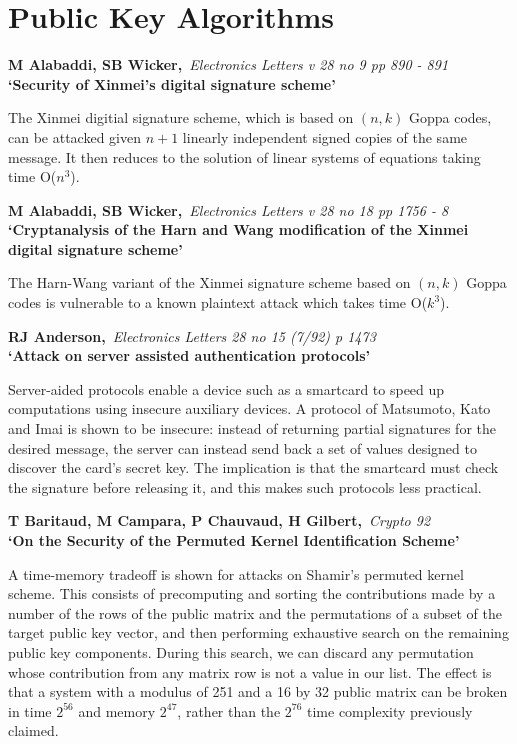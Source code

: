 \pagebreak

\normalsize
\section{Public Key Algorithms}
\small

{\bf \noindent M Alabaddi, SB Wicker,}{\em ~Electronics Letters v 28 no 9 
pp 890 - 891\\}
{\bf `Security of Xinmei's digital signature scheme'}

The Xinmei digitial signature scheme, which is based on $(n,k)$ Goppa codes,
can be attacked given $n+1$ linearly independent signed copies of the same
message. It then reduces to the solution of linear systems of equations taking
time O($n^3$).

{\bf \noindent M Alabaddi, SB Wicker,}{\em ~Electronics Letters v 28 no 18 
pp 1756 - 8\\}
{\bf `Cryptanalysis of the Harn and Wang modification of the Xinmei digital
signature scheme'}

The Harn-Wang variant of the Xinmei signature scheme based on $(n,k)$ Goppa
codes is vulnerable to a known plaintext attack which takes time O($k^3$).

{\bf \noindent RJ Anderson,}{\em ~Electronics Letters 28 no 15 (7/92) p 1473\\}
{\bf `Attack on server assisted authentication protocols'}

Server-aided protocols enable a device such as a smartcard to speed up
computations using insecure auxiliary devices. A protocol of Matsumoto,
Kato and Imai is shown to be insecure: instead of returning partial
signatures for the desired message, the server can instead send back a
set of values designed to discover the card's secret key. The implication
is that the smartcard must check the signature before releasing it, and 
this makes such protocols less practical.

{\bf \noindent T Baritaud, M Campara, P Chauvaud, H Gilbert,}{\em ~Crypto 92\\}
{\bf `On the Security of the Permuted Kernel Identification Scheme'}

A time-memory tradeoff is shown for attacks on Shamir's permuted kernel
scheme. This consists of precomputing and sorting the contributions
made by a number of the rows of the public matrix and the permutations
of a subset of the target public key vector, and then performing exhaustive
search on the remaining public key components. During this search, we can
discard any permutation whose contribution from any matrix row is not a
value in our list. The effect is that a system with a modulus of 251 and
a 16 by 32 public matrix can be broken in time $2^{56}$ and memory $2^{47}$, 
rather than the $2^{76}$ time complexity previously claimed.

